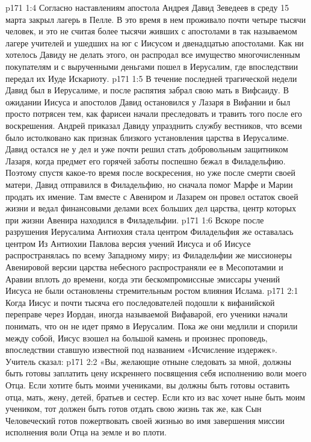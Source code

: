 \vs p171 1:4 Согласно наставлениям апостола Андрея Давид Зеведеев в среду 15 марта закрыл лагерь в Пелле. В это время в нем проживало почти четыре тысячи человек, и это не считая более тысячи живших с апостолами в так называемом лагере учителей и ушедших на юг с Иисусом и двенадцатью апостолами. Как ни хотелось Давиду не делать этого, он распродал все имущество многочисленным покупателям и с вырученными деньгами пошел в Иерусалим, где впоследствии передал их Иуде Искариоту.
\vs p171 1:5 \pc В течение последней трагической недели Давид был в Иерусалиме, и после распятия забрал свою мать в Вифсаиду. В ожидании Иисуса и апостолов Давид остановился у Лазаря в Вифании и был просто потрясен тем, как фарисеи начали преследовать и травить того после его воскрешения. Андрей приказал Давиду упразднить службу вестников, что всеми было истолковано как признак близкого установления царства в Иерусалиме. Давид остался не у дел и уже почти решил стать добровольным защитником Лазаря, когда предмет его горячей заботы поспешно бежал в Филадельфию. Поэтому спустя какое\hyp{}то время после воскресения, но уже после смерти своей матери, Давид отправился в Филадельфию, но сначала помог Марфе и Марии продать их имение. Там вместе с Авениром и Лазарем он провел остаток своей жизни и ведал финансовыми делами всех больших дел царства, центр которых при жизни Авенира находился в Филадельфии.
\vs p171 1:6 Вскоре после разрушения Иерусалима Антиохия стала центром  Филадельфия же оставалась центром  Из Антиохии Павлова версия учений Иисуса и об Иисусе распространялась по всему Западному миру; из Филадельфии же миссионеры Авенировой версии царства небесного распространяли ее в Месопотамии и Аравии вплоть до времени, когда эти бескомпромиссные эмиссары учений Иисуса не были остановлены стремительным ростом влияния Ислама.
\vs p171 2:1 Когда Иисус и почти тысяча его последователей подошли к вифанийской переправе через Иордан, иногда называемой Вифаварой, его ученики начали понимать, что он не идет прямо в Иерусалим. Пока же они медлили и спорили между собой, Иисус взошел на большой камень и произнес проповедь, впоследствии ставшую известной под названием «Исчисление издержек». Учитель сказал:
\vs p171 2:2 \pc «Вы, желающие отныне следовать за мной, должны быть готовы заплатить цену искреннего посвящения себя исполнению воли моего Отца. Если хотите быть моими учениками, вы должны быть готовы оставить отца, мать, жену, детей, братьев и сестер. Если кто из вас хочет ныне быть моим учеником, тот должен быть готов отдать свою жизнь так же, как Сын Человеческий готов пожертвовать своей жизнью во имя завершения миссии исполнения воли Отца на земле и во плоти.
